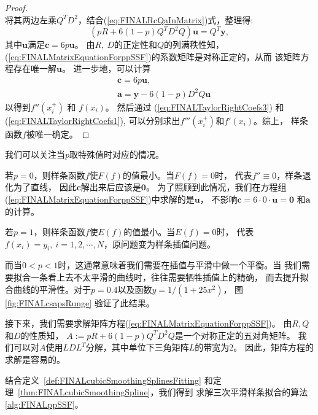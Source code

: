 \begin{proof}
\begin{displaymath}
  \end{displaymath}
  将其两边左乘$Q^{T}D^{2}$，结合(\ref{eq:FINALRcQaInMatrix})式，整理得: 
  \begin{equation}
    \label{eq:FINALMatrixEquationForppSSF}
    (pR+6(1-p)Q^{T}D^{2}Q)\mathbf{u}=Q^{T}\mathbf{y},
  \end{equation}
  其中$\mathbf{u}$满足$\mathbf{c}=6p\mathbf{u}$。
  由$R,\ D$的正定性和$Q$的列满秩性知，
  (\ref{eq:FINALMatrixEquationForppSSF})的系数矩阵是对称正定的，从而
  该矩阵方程存在唯一解$\mathbf{u}$。
  进一步地，可以计算
  \begin{align*}
    &\ \mathbf{c}=6p\mathbf{u},\\
    &\ \mathbf{a} = \mathbf{y} - 6(1-p)D^{2}Q\mathbf{u}
  \end{align*}
  以得到$f''(x_{i}^{+})$ 和 $f(x_{i})$。
  然后通过
  (\ref{eq:FINALTaylorRightCoefs3})
  和(\ref{eq:FINALTaylorRightCoefs1}),
  可以分别求出$f'''(x_{i}^{+})$和$f'(x_{i})$。综上，
  样条函数$f$被唯一确定。
\end{proof}

我们可以关注当$p$取特殊值时对应的情况。

  若$p=0$，则样条函数$f$使$F(f)$的值最小。当$F(f)=0$时，
  代表$f''\equiv 0$，样条退化为了直线，
  因此$\mathbf{c}$解出来后应该是$\mathbf{0}$。
  为了照顾到此情况，我们在方程组
  (\ref{eq:FINALMatrixEquationForppSSF})中求解的是$\mathbf{u}$，
  不影响$\mathbf{c}=6\cdot0\cdot \mathbf{u}=\mathbf{0}$
  和$\mathbf{a}$的计算。

  若$p=1$，则样条函数$f$使$E(f)$的值最小。当$E(f)=0$时，
  代表$f(x_{i})=y_{i},\ i=1,2,\cdots,N$，原问题变为样条插值问题。

  而当$0<p<1$时，这通常意味着我们需要在插值与平滑中做一个平衡。当
  我们需要拟合一条看上去不太平滑的曲线时，往往需要牺牲插值上的精确，
  而去提升拟合曲线的平滑性。对于$p=0.4$以及函数$y=1/(1+25x^{2})$，
  图 \ref{fig:FINALcsapsRunge} 验证了此结果。

  接下来，我们需要求解矩阵方程(\ref{eq:FINALMatrixEquationForppSSF})。
  由$R,Q$和$D$的性质知，
  $A:=pR+6(1-p)Q^{T}D^{2}Q$是一个对称正定的五对角矩阵。
  我们可以对$A$使用$LDL^{T}$分解，其中单位下三角矩阵$L$的带宽为2。
  因此，矩阵方程的求解是容易的。

  结合定义~\ref{def:FINALcubicSmoothingSplinesFitting}
  和定理~\ref{thm:FINALcubicSmoothingSpline}，我们得到
  求解三次平滑样条拟合的算法 \ref{alg:FINALppSSF}。

